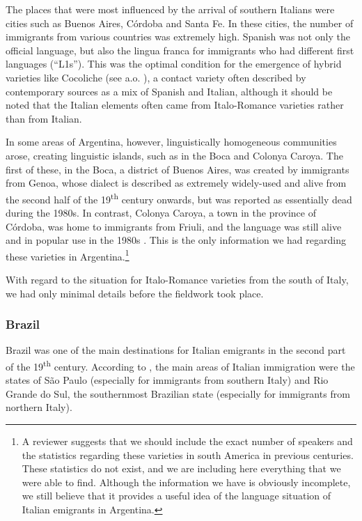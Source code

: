 \documentclass[output=paper,hidelinks]{langscibook}
\begin{document}
The places that were most influenced by the arrival of southern Italians were cities such as Buenos Aires, Córdoba and Santa Fe. In these cities, the number of immigrants from various countries was extremely high. Spanish was not only the official language, but also the lingua franca for immigrants who had different first languages (``L1s''). This was the optimal condition for the emergence of hybrid varieties like Cocoliche (see a.o. \citealt{Bagna2011}), a contact variety often described by contemporary sources as a mix of Spanish and Italian, although it should be noted that the Italian elements often came from Italo-Romance varieties rather than from Italian.

In some areas of Argentina, however, linguistically homogeneous communities arose, creating linguistic islands, such as in the Boca and Colonya Caroya. The first of these, in the Boca, a district of Buenos Aires, was created by immigrants from Genoa, whose dialect is described as extremely widely-used and alive from the second half of the 19\textsuperscript{th} century onwards, but was reported as essentially dead during the 1980s. In contrast, Colonya Caroya, a town in the province of Córdoba, was home to immigrants from Friuli, and the language was still alive and in popular use in the 1980s \citep{MeoZilio1990}. This is the only information we had regarding these varieties in Argentina.\footnote{A reviewer suggests that we should include the exact number of speakers and the statistics regarding these varieties in south America in previous centuries. These statistics do not exist, and we are including here everything that we were able to find. Although the information we have is obviously incomplete, we still believe that it provides a useful idea of the language situation of Italian emigrants in Argentina.}

With regard to the situation for Italo-Romance varieties from the south of Italy, we had only minimal details before the fieldwork took place. 

\subsubsection{Brazil}\label{sec:andriani:2.1.2}

Brazil was one of the main destinations for Italian emigrants in the second part of the 19\textsuperscript{th} century. According to \citet{Cenni2003}, the main areas of Italian immigration were the states of São Paulo (especially for immigrants from southern Italy) and Rio Grande do Sul, the southernmost Brazilian state (especially for immigrants from northern Italy).
\end{document}

